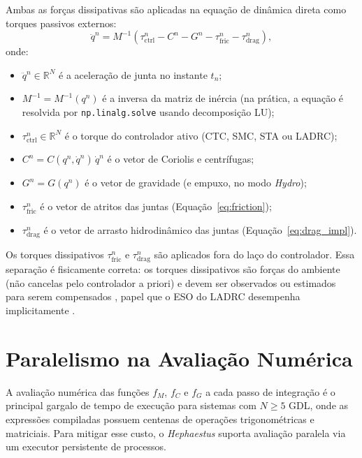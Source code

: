 Ambas as forças dissipativas são aplicadas na equação de dinâmica direta como torques passivos externos:
\begin{equation}
    \ddot{q}^n = M^{-1}\!\left(\tau_{\text{ctrl}}^n - C^n - G^n - \tau_{\text{fric}}^n - \tau_{\text{drag}}^n\right),
    \label{eq:dyn_complete}
\end{equation}
onde:
\begin{itemize}
    \item $\ddot{q}^n \in \mathbb{R}^N$ é a aceleração de junta no instante $t_n$;
    \item $M^{-1} = M^{-1}(q^n)$ é a inversa da matriz de inércia (na prática, a equação é resolvida por \texttt{np.linalg.solve} usando decomposição LU);
    \item $\tau_{\text{ctrl}}^n \in \mathbb{R}^N$ é o torque do controlador ativo (CTC, SMC, STA ou LADRC);
    \item $C^n = C(q^n,\dot{q}^n)\,\dot{q}^n$ é o vetor de Coriolis e centrífugas;
    \item $G^n = G(q^n)$ é o vetor de gravidade (e empuxo, no modo \textit{Hydro});
    \item $\tau_{\text{fric}}^n$ é o vetor de atritos das juntas (Equação~\eqref{eq:friction});
    \item $\tau_{\text{drag}}^n$ é o vetor de arrasto hidrodinâmico das juntas (Equação~\eqref{eq:drag_impl}).
\end{itemize}
Os torques dissipativos $\tau_{\text{fric}}^n$ e $\tau_{\text{drag}}^n$ são aplicados fora do laço do controlador. Essa separação é fisicamente correta: os torques dissipativos são forças do ambiente (não cancelas pelo controlador a priori) e devem ser observados ou estimados para serem compensados , papel que o ESO do LADRC desempenha implicitamente \cite{han2009pid, huang2014active}.

\section{Paralelismo na Avaliação Numérica}
\label{sec:parallel_sim}

A avaliação numérica das funções $f_M$, $f_C$ e $f_G$ a cada passo de integração é o principal gargalo de tempo de execução para sistemas com $N \geq 5$ GDL, onde as expressões compiladas possuem centenas de operações trigonométricas e matriciais. Para mitigar esse custo, o \textit{Hephaestus} suporta avaliação paralela via um executor persistente de processos.

